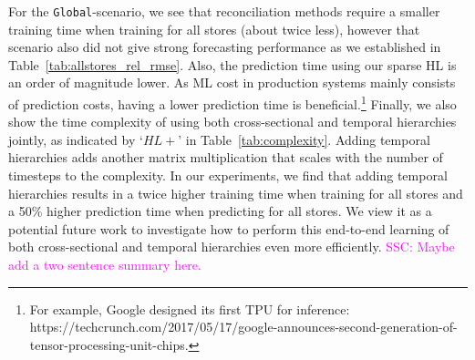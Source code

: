 \documentclass[preprint, 3p, times, twocolumn]{elsarticle}
\newcommand{\ssc}[1]{\textcolor{magenta}{SSC: #1.}}
\begin{document}
  For the \texttt{Global}-scenario, we see that reconciliation methods require a smaller training time when training for all stores (about twice less), however that scenario also did not give strong forecasting performance as we established in Table~\ref{tab:allstores_rel_rmse}. Also, the prediction time using our sparse HL is an order of magnitude lower. As ML cost in production systems mainly consists of prediction costs, having a lower prediction time is beneficial.\footnote{For example, Google designed its first TPU for inference: https://techcrunch.com/2017/05/17/google-announces-second-generation-of-tensor-processing-unit-chips.}
  Finally, we also show the time complexity of using both cross-sectional and temporal hierarchies jointly, as indicated by `\(HL+\)' in Table~\ref{tab:complexity}. Adding temporal hierarchies adds another matrix multiplication that scales with the number of timesteps to the complexity. In our experiments, we find that adding temporal hierarchies results in a twice higher training time when training for all stores and a 50\% higher prediction time when predicting for all stores. We view it as a potential future work to investigate how to perform this end-to-end learning of both cross-sectional and temporal hierarchies even more efficiently. \ssc{Maybe add a two sentence summary here}
  
\end{document}
